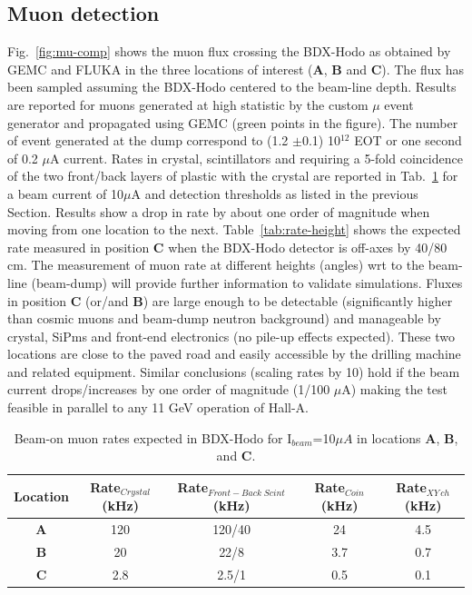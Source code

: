 \subsection{Muon detection} 
Fig.~\ref{fig:mu-comp} shows the muon flux crossing the BDX-Hodo  as obtained by GEMC and FLUKA  in the  three locations of interest ({\bf A}, {\bf B} and {\bf C}).
The flux has been sampled assuming the BDX-Hodo centered to  the beam-line depth.
Results are reported for muons generated at high statistic by the custom $\mu$ event generator and propagated using GEMC (green points in the figure).
The number of event generated at the dump correspond to  (1.2 $\pm$0.1) 10$^{12}$ EOT or one second of 0.2 $\mu$A current.
Rates in crystal, scintillators and  requiring a 5-fold coincidence of the two front/back layers of plastic with  the crystal are reported in Tab.~\ref{tab:rate} for a beam current of 10$\mu$A and detection thresholds as listed in the previous Section. Results show a drop in rate by about one order of magnitude when moving from one location to the next. 
Table~\ref{tab:rate-height}  shows the expected rate measured in  position {\bf C}  when the BDX-Hodo detector is off-axes by 40/80 cm. The measurement of muon rate at different heights (angles) wrt to the beam-line (beam-dump) will provide further information to validate simulations.  
Fluxes in position {\bf C} (or/and {\bf B}) are large enough to be detectable (significantly higher than cosmic muons and beam-dump neutron background) and manageable  by crystal, SiPms and front-end electronics (no pile-up effects expected). These two locations are close to the paved road and easily accessible by the drilling machine and related equipment. Similar conclusions (scaling rates by 10) hold  if the beam current drops/increases by one order of magnitude (1/100 $\mu$A) making the test feasible in parallel to any 11 GeV operation of Hall-A.

\begin{table}[htp]
\caption{Beam-on muon rates expected in BDX-Hodo for I$_{beam}$=10$\mu A$ in locations {\bf A}, {\bf B},  and {\bf C}.}
\begin{center}
\begin{tabular}{|c|c|c|c|c|}
\hline
Location & Rate$_{Crystal}$  (kHz)&  Rate$_{Front-Back \;Scint} $(kHz) & Rate$_{Coin}$ (kHz) & Rate$_{XY\, ch} $(kHz)\\
\hline\hline
{\bf A}  & 120  &120/40    & 24 &4.5 \\
 \hline
{\bf B} & 20 &  22/8 & 3.7 & 0.7\\
 \hline
{\bf C} & 2.8 &  2.5/1 & 0.5 & 0.1 \\
\hline\hline
\end{tabular}
\end{center}
\label{tab:rate}
\end{table}%

